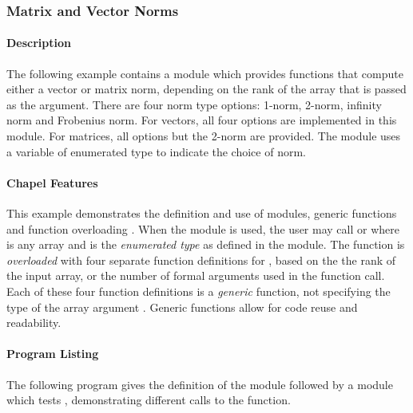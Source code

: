 \subsubsection{Matrix and Vector Norms}

\paragraph{Description}
The following example contains a module  which provides  
 functions that compute either a vector or matrix norm, depending
on the rank of the array that is passed as the argument.  There are four
norm type options:  1-norm, 2-norm, infinity norm and Frobenius norm.  For vectors,  
all four options are implemented in this module.  
For matrices, all options but the 2-norm are provided.   
The module uses a variable of enumerated type  to 
indicate the choice of norm.

\paragraph{Chapel Features}
This example demonstrates the definition and use of modules, generic functions
 and function overloading .
When the  module is used, the user may call 
 or  where
 is any array and  is the {\em enumerated type} as defined
in the  module.  The  function is {\em overloaded} with
four separate function definitions for , based on the
the rank of the input array, or the number of formal
arguments used in the  function call.  Each of these four function
definitions is a {\em generic} function, not specifying the type of the array
argument .  Generic functions allow for code reuse and readability.

\paragraph{Program Listing}
The following program gives the definition of the  module followed
by a module which tests , demonstrating different calls to the 
function.

